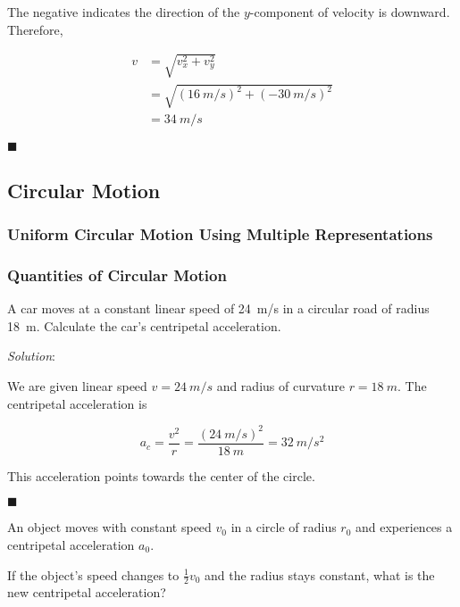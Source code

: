 \documentclass[dvipsnames]{article}
\begin{document}
The negative indicates the direction of the $y$-component of velocity is downward. Therefore,

\begin{align*}
    v &= \sqrt{v_x^2 + v_y^2} \\[1ex]
    &= \sqrt{(\SI{16}{m/s})^2 + (-\SI{30}{m/s})^2} \\[1ex]
    &= \boxed{\SI{34}{m/s}}
\end{align*}

\hfill $\blacksquare$

\clearpage

\subsection{Circular Motion}

\subsubsection{Uniform Circular Motion Using Multiple Representations}

\subsubsection{Quantities of Circular Motion}

\begin{example}
A car moves at a constant linear speed of \SI{24}{m/s} in a circular road of radius \SI{18}{m}. Calculate the car's centripetal acceleration.
\end{example}

\textit{Solution}:

We are given linear speed $v = \SI{24}{m/s}$ and radius of curvature $r = \SI{18}{m}$. The centripetal acceleration is

\begin{equation*}
    a_c = \frac{v^2}{r} = \frac{\left(\SI{24}{m/s}\right)^2}{\SI{18}{m}} = \boxed{\SI{32}{m/s^2}}
\end{equation*}

This acceleration points towards the center of the circle.

\hfill $\blacksquare$

\begin{example}
An object moves with constant speed $v_0$ in a circle of radius $r_0$ and experiences a centripetal acceleration $a_0$. 

\begin{center}
\end{center}

If the object's speed changes to $\frac{1}{2}v_0$ and the radius stays constant, what is the new centripetal acceleration?
\end{example}
\end{document}
